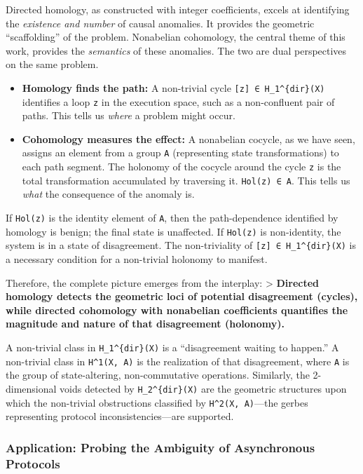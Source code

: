 \documentclass[
]{article}
\begin{document}
Directed homology, as constructed with integer coefficients, excels at
identifying the \emph{existence and number} of causal anomalies. It
provides the geometric ``scaffolding'' of the problem. Nonabelian
cohomology, the central theme of this work, provides the
\emph{semantics} of these anomalies. The two are dual perspectives on
the same problem.

\begin{itemize}
\item
  \textbf{Homology finds the path:} A non-trivial cycle
  \texttt{{[}z{]}\ ∈\ H\_1\^{}\{dir\}(X)} identifies a loop \texttt{z}
  in the execution space, such as a non-confluent pair of paths. This
  tells us \emph{where} a problem might occur.
\item
  \textbf{Cohomology measures the effect:} A nonabelian cocycle, as we
  have seen, assigns an element from a group \texttt{A} (representing
  state transformations) to each path segment. The holonomy of the
  cocycle around the cycle \texttt{z} is the total transformation
  accumulated by traversing it. \texttt{Hol(z)\ ∈\ A}. This tells us
  \emph{what} the consequence of the anomaly is.
\end{itemize}

If \texttt{Hol(z)} is the identity element of \texttt{A}, then the
path-dependence identified by homology is benign; the final state is
unaffected. If \texttt{Hol(z)} is non-identity, the system is in a state
of disagreement. The non-triviality of
\texttt{{[}z{]}\ ∈\ H\_1\^{}\{dir\}(X)} is a necessary condition for a
non-trivial holonomy to manifest.

Therefore, the complete picture emerges from the interplay:
\textgreater{} \textbf{Directed homology detects the geometric loci of
potential disagreement (cycles), while directed cohomology with
nonabelian coefficients quantifies the magnitude and nature of that
disagreement (holonomy).}

A non-trivial class in \texttt{H\_1\^{}\{dir\}(X)} is a ``disagreement
waiting to happen.'' A non-trivial class in \texttt{H\^{}1(X,\ A)} is
the realization of that disagreement, where \texttt{A} is the group of
state-altering, non-commutative operations. Similarly, the 2-dimensional
voids detected by \texttt{H\_2\^{}\{dir\}(X)} are the geometric
structures upon which the non-trivial obstructions classified by
\texttt{H\^{}2(X,\ A)}---the gerbes representing protocol
inconsistencies---are supported.

\subsubsection{Application: Probing the Ambiguity of Asynchronous
Protocols}\label{application-probing-the-ambiguity-of-asynchronous-protocols}
\end{document}
